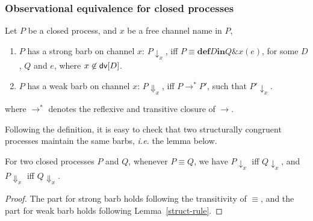 \documentclass{LMCS}
\makeatletter
\newcommand{\forget}[1]{}
\renewcommand{\exp}{e}
\newcommand{\ie}{\emph{i.e.}\@\xspace}
\newcommand{\kwd}[1]{\ensuremath{\mathbf{#1}}}
\newcommand{\prefix}[1]{\mathopen{}\mathrel{\kwd {#1}}}
\newcommand{\infix}[1]{\mathrel{\kwd {#1}}}
\renewcommand{\_}{\mathord{\rule[-.25ex]{1ex}{.15ex}}}
\newcommand{\para}[2]{#1\mathop{\&}#2}
\newcommand{\define}[2]{\prefix{def} #1 \infix{in} #2}
\newcommand{\reduces}{\longrightarrow}
\newcommand{\weakbarb}[2]{#1\!\Downarrow_{#2}}
\newcommand{\barb}[2]{#1\!\downarrow_{#2}}
\newcommand{\dv}[1]{\mbox{\sf dv}[#1]}
\makeatother
\begin{document}
\subsubsection{Observational equivalence for closed processes}
\begin{defi}
  Let $P$ be a closed process, and $x$ be a free channel name in $P$,
  \begin{enumerate}[(1)]
  \item $P$ has a strong barb on channel $x$: $\barb{P}{x}$, iff $ P
    \equiv \define{D}{\para{Q}{x(\exp)}}$, for some $D$, $Q$ and
    $\exp$, where $x \not\in \dv{D}$.
  \item $P$ has a weak barb on channel $x$: $\weakbarb{P}{x}$, iff $P
    \reduces^* P'$, such that $\barb{P'}{x}$.
  \end{enumerate}
  where $\reduces^*$ denotes the reflexive and
  transitive closure of $\reduces$.
\end{defi}
Following the definition, it is easy to check that two structurally
congruent processes maintain the same barbs, \ie the lemma below.
\begin{lem}\label{lemma.barb}
  For two closed processes $P$ and $Q$, whenever $P\equiv Q$, we have
  $\barb{P}{x}$ iff $\barb{Q}{x}$, and $\weakbarb{P}{x}$ iff
  $\weakbarb{Q}{x}$.
\end{lem}
\begin{proof}
  The part for strong barb holds following the transitivity of
  $\equiv$, and the part for weak barb holds following
  Lemma~\ref{struct-rule}.  \forget{\qed}
\end{proof}
\end{document}
